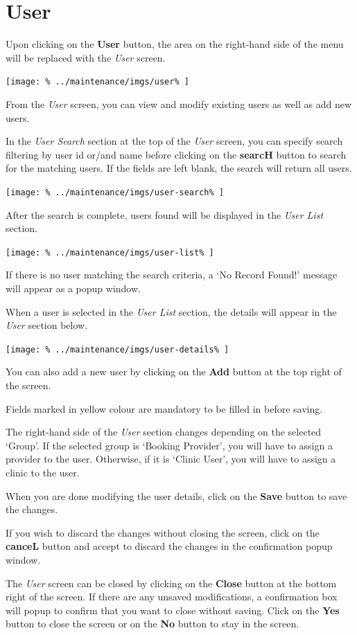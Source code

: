 \documentclass[../main/main]{subfiles}
\begin{document}
\newpage
\section{User}
\label{sec:user}

Upon clicking on the \textbf{User} button,
the area on the right-hand side of the menu will be replaced with the
\emph{User} screen.

\texttt{[image: \%
  ../maintenance/imgs/user\%
]}

From the \emph{User} screen, you can view and modify existing users as well as
add new users.

In the \emph{User Search} section at the top of the \emph{User} screen,
you can specify search filtering by user id or/and name before
clicking on the \textbf{searcH} button to search for the matching users.
If the fields are left blank, the search will return all users.

\texttt{[image: \%
  ../maintenance/imgs/user-search\%
]}

After the search is complete, users found will be displayed in the
\emph{User List} section.

\texttt{[image: \%
  ../maintenance/imgs/user-list\%
]}

If there is no user matching the search criteria, a `No Record Found!'
message will appear as a popup window.

\pagebreak
When a user is selected in the \emph{User List} section, the details
will appear in the \emph{User} section below.

\texttt{[image: \%
  ../maintenance/imgs/user-details\%
]}

You can also add a new user by clicking on the \textbf{Add} button at the
top right of the screen.

Fields marked in yellow colour are mandatory to be filled in before saving.

The right-hand side of the \emph{User} section changes depending on the selected
`Group'. If the selected group is `Booking Provider', you will have to assign
a provider to the user. Otherwise, if it is `Clinic User', you will have to
assign a clinic to the user.

When you are done modifying the user details, click on the \textbf{Save}
button to save the changes.

If you wish to discard the changes without closing the screen, click on the
\textbf{canceL} button and accept to discard the changes in the confirmation
popup window.

The \emph{User} screen can be closed by clicking on the
\textbf{Close} button at the bottom right of the screen. If there are any
unsaved modifications, a confirmation box will popup to confirm that you want
to close without saving. Click on the \textbf{Yes} button to close the screen
or on the \textbf{No} button to stay in the screen.
\end{document}
